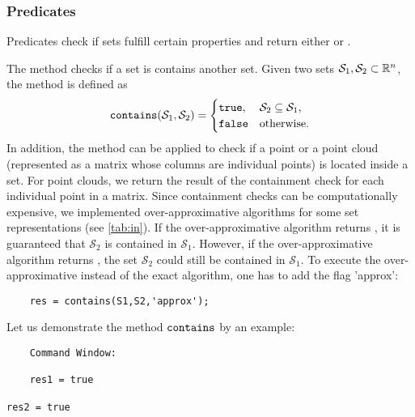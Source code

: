 \subsubsection{Predicates}

Predicates check if sets fulfill certain properties and return either  or .


The method  checks if a set is contains another set.
Given two sets $\mathcal{S}_1,\mathcal{S}_2 \subset \mathbb{R}^n$, the method  is defined as
	\begin{equation*}
		{\normalfont \texttt{contains}}(\mathcal{S}_1,\mathcal{S}_2) = 
		\begin{cases}
			{\normalfont \texttt{true}}, & \mathcal{S}_2 \subseteq \mathcal{S}_1, \\
			{\normalfont \texttt{false}} & \mathrm{otherwise}.
		\end{cases}
	\end{equation*}
In addition, the method  can be applied to check if a point or a point cloud (represented as a matrix whose columns are individual points) is located inside a set. For point clouds, we return the result of the containment check for each individual point in a matrix. Since containment checks can be computationally expensive, we implemented over-approximative algorithms for some set representations (see \cref{tab:in}). If the over-approximative algorithm returns , it is guaranteed that $\mathcal{S}_2$ is contained in $\mathcal{S}_1$. However, if the over-approximative algorithm returns , the set $\mathcal{S}_2$ could still be contained in $\mathcal{S}_1$. To execute the over-approximative instead of the exact algorithm, one has to add the flag 'approx':
\begin{verbatim}
	res = contains(S1,S2,'approx');
\end{verbatim}

Let us demonstrate the method ${\normalfont \texttt{contains}}$ by an example:

\begin{center}
\begin{minipage}[t]{0.40\textwidth}
	\vspace{10pt}
	\footnotesize
	
\end{minipage}
\begin{minipage}[t]{0.2\textwidth}
	\vspace{10pt}

	\begin{verbatim}
	Command Window:	
		
	res1 = true
	
res2 = true
	\end{verbatim}
\end{minipage}
\begin{minipage}[t]{0.3\textwidth}
	\vspace{0pt}
	\centering
\end{minipage}
\end{center}

